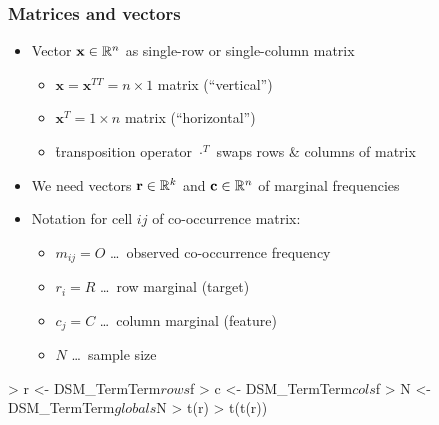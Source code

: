 \documentclass[t]{beamer} %
\begin{document}
\begin{frame}[fragile]
  \frametitle{Matrices and vectors}

  \ungap[1]
  \begin{itemize}
  \item Vector $\mathbf{x}\in \mathbb{R}^n$ as single-row or single-column matrix
    \begin{itemize}
    \item $\mathbf{x} = \mathbf{x}^{TT} = n\times 1$ matrix (``vertical'')
    \item $\mathbf{x}^T = 1\times n$ matrix (``horizontal'')
    \item \h{transposition} operator $\cdot^T$ swaps rows \& columns of matrix 
    \end{itemize}
  \item<2-> We need vectors $\mathbf{r} \in \mathbb{R}^k$ and $\mathbf{c} \in \mathbb{R}^n$ of marginal frequencies
  \item<2-> Notation for cell $ij$ of co-occurrence matrix:
    \begin{itemize}
    \item $m_{ij} = O$ \ldots\ observed co-occurrence frequency
    \item $r_i = R$ \ldots\ row marginal (target)
    \item $c_j = C$ \ldots\ column marginal (feature)
    \item $N$ \ldots\ sample size
    \end{itemize}
  \end{itemize}

\begin{Rcode}
> r <- DSM_TermTerm$rows$f
> c <- DSM_TermTerm$cols$f
> N <- DSM_TermTerm$globals$N
> t(r)    
> t(t(r))  
\end{Rcode} %
\end{frame}
\end{document}
